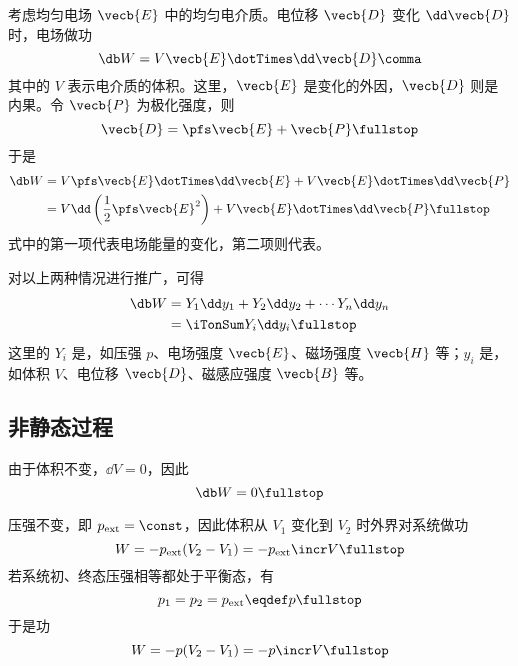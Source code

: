 \begin{myEnum1}
        
        考虑均匀电场 $\vecb{E}$ 中的均匀电介质。电位移 $\vecb{D}$ 变化 $\dd \vecb{D}$ 时，电场做功
        \begin{equation}
          \db W = V \vecb{E} \dotTimes \dd \vecb{D} \comma
        \end{equation}
        其中的 $V$ 表示电介质的体积。这里，$\vecb{E}$ 是变化的外因，$\vecb{D}$ 则是内果。令 $\vecb{P}$ 为极化强度，则
        \begin{equation}
          \vecb{D} = \pfs \vecb{E} + \vecb{P} \fullstop
        \end{equation}
        于是
        \begin{equation}
          \begin{aligned}
            \db W &= V \pfs \vecb{E} \dotTimes \dd \vecb{E} + V \vecb{E} \dotTimes \dd \vecb{P} \\
            &= V \dd \left( \frac{1}{2} \pfs \vecb{E}^2 \right) + V 
            \vecb{E} \dotTimes \dd \vecb{P} \fullstop
          \end{aligned}
        \end{equation}
        式中的第一项代表电场能量的变化，第二项则代表。
    \end{myEnum1}
    
    对以上两种情况进行推广，可得
    \begin{align} \label{EQ_GENERAL_WORK}
      \db W &= Y_1 \dd y_1 + Y_2 \dd y_2 + \cdots Y_n \dd y_n \notag \\
      &= \iTonSum Y_i \dd y_i \fullstop
    \end{align}
    这里的 $Y_i$ 是，如压强 $p$、电场强度 $\vecb{E}$、磁场强度 $\vecb{H}$ 等；$y_i$ 是，如体积 $V$、电位移 $\vecb{D}$、磁感应强度 $\vecb{B}$ 等。
    
  \subsection{非静态过程}
    \begin{myEnum1}
        由于体积不变，$\dd V = 0$，因此
        \begin{equation} \label{EQ_WORK_IN_ISOCHORIC_PROCESS}
          \db W = 0 \fullstop
        \end{equation}
        
        压强不变，即 $p_{\text{ext}} = \const$，因此体积从 $V_1$ 变化到 $V_2$ 时外界对系统做功
        \begin{equation}
          W = -p_{\text{ext}} (V_2 - V_1) = -p_{\text{ext}} \incr V \fullstop
        \end{equation}
        若系统初、终态压强相等都处于平衡态，有
        \begin{equation}
          p_1 = p_2 = p_{\text{ext}} \eqdef p \fullstop
        \end{equation}
        于是功
        \begin{equation} \label{EQ_WORK_IN_ISOBARIC_PROCESS}
          W = -p (V_2 - V_1) = -p \incr V \fullstop
        \end{equation}
    \end{myEnum1}
    
